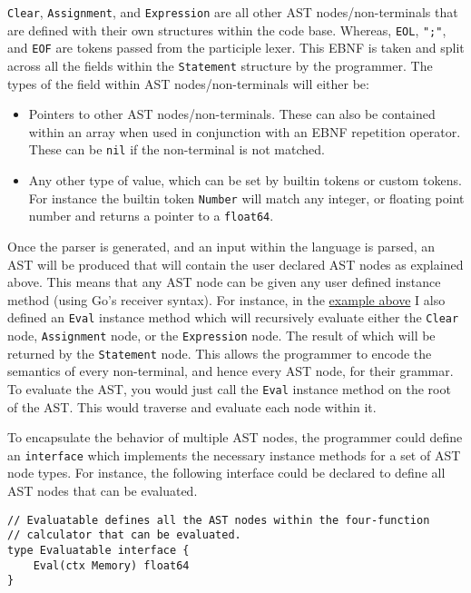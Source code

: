 \verb|Clear|, \verb|Assignment|, and \verb|Expression| are all other AST nodes/non-terminals that are defined with their own structures within the code base. Whereas, \verb|EOL|, \verb|";"|, and \verb|EOF| are tokens passed from the participle lexer. This EBNF is taken and split across all the fields within the \verb|Statement| structure by the programmer. The types of the field within AST nodes/non-terminals will either be:

\begin{itemize}
    \item Pointers to other AST nodes/non-terminals. These can also be contained within an array when used in conjunction with an EBNF repetition operator. These can be \texttt{nil} if the non-terminal is not matched.
    \item Any other type of value, which can be set by builtin tokens or custom tokens. For instance the builtin token \verb|Number| will match any integer, or floating point number and returns a pointer to a \texttt{float64}.
\end{itemize}

Once the parser is generated, and an input within the language is parsed, an AST will be produced that will contain the user declared AST nodes as explained above. This means that any AST node can be given any user defined instance method (using Go's receiver syntax). For instance, in the \hyperref[fig:four-func-calc-statement-ast-node]{example above} I also defined an \verb|Eval| instance method which will recursively evaluate either the \verb|Clear| node, \verb|Assignment| node, or the \verb|Expression| node. The result of which will be returned by the \verb|Statement| node. This allows the programmer to encode the semantics of every non-terminal, and hence every AST node, for their grammar. To evaluate the AST, you would just call the \verb|Eval| instance method on the root of the AST. This would traverse and evaluate each node within it.

To encapsulate the behavior of multiple AST nodes, the programmer could define an \texttt{interface} which implements the necessary instance methods for a set of AST node types. For instance, the following interface could be declared to define all AST nodes that can be evaluated.

\begin{verbatim}
// Evaluatable defines all the AST nodes within the four-function 
// calculator that can be evaluated.
type Evaluatable interface {
    Eval(ctx Memory) float64
}
\end{verbatim}

